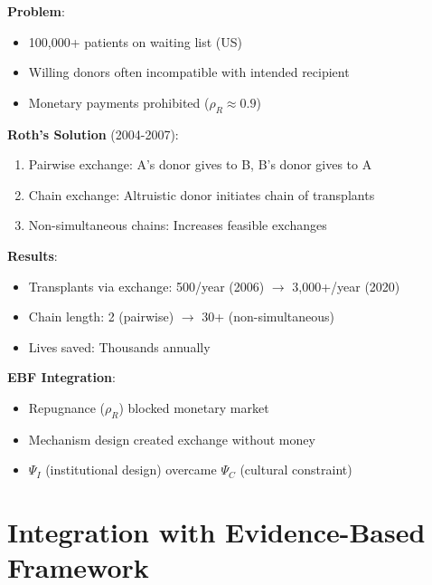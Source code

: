 \begin{tcolorbox}[colback=green!5!white,colframe=green!75!black,title=Worked Example: Kidney Exchange]
\textbf{Problem}:
\begin{itemize}
    \item 100,000+ patients on waiting list (US)
    \item Willing donors often incompatible with intended recipient
    \item Monetary payments prohibited ($\rho_R \approx 0.9$)
\end{itemize}

\textbf{Roth's Solution} (2004-2007):
\begin{enumerate}
    \item Pairwise exchange: A's donor gives to B, B's donor gives to A
    \item Chain exchange: Altruistic donor initiates chain of transplants
    \item Non-simultaneous chains: Increases feasible exchanges
\end{enumerate}

\textbf{Results}:
\begin{itemize}
    \item Transplants via exchange: 500/year (2006) $\rightarrow$ 3,000+/year (2020)
    \item Chain length: 2 (pairwise) $\rightarrow$ 30+ (non-simultaneous)
    \item Lives saved: Thousands annually
\end{itemize}

\textbf{EBF Integration}:
\begin{itemize}
    \item Repugnance ($\rho_R$) blocked monetary market
    \item Mechanism design created exchange without money
    \item $\Psi_I$ (institutional design) overcame $\Psi_C$ (cultural constraint)
\end{itemize}
\end{tcolorbox}

\section{Integration with Evidence-Based Framework}

